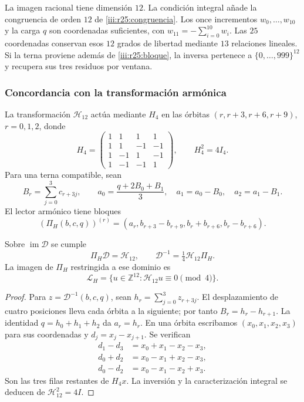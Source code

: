 La imagen racional tiene dimensión $12$. La condición integral añade
la congruencia de orden $12$ de \eqref{iii:r25:congruencia}.
Los once incrementos $w_0,\ldots,w_{10}$ y la carga $q$ son
coordenadas suficientes, con $w_{11}=-\sum_{i=0}^{10}w_i$.
Las $25$ coordenadas conservan esos $12$ grados de libertad
mediante $13$ relaciones lineales. Si la terna proviene además de
\eqref{iii:r25:bloque}, la inversa pertenece a
$\{0,\ldots,999\}^{12}$ y recupera sus tres residuos por ventana.

\subsubsection{Concordancia con la transformación armónica}

La transformación $\mathcal H_{12}$ actúa mediante $H_4$ en las
órbitas $(r,r+3,r+6,r+9)$, $r=0,1,2$, donde
\[
 H_4=\begin{pmatrix}
 1&1&1&1\\1&1&-1&-1\\1&-1&1&-1\\1&-1&-1&1
 \end{pmatrix},\qquad H_4^2=4I_4.
\]
Para una terna compatible, sean
\[
 B_r=\sum_{j=0}^3c_{r+3j},\qquad
 a_0=\frac{q+2B_0+B_1}{3},\quad
 a_1=a_0-B_0,\quad a_2=a_1-B_1.
\]
El lector armónico tiene bloques
\[
 (\Pi_H(b,c,q))^{(r)}
 =(a_r,b_{r+3}-b_{r+9},b_r+b_{r+6},b_r-b_{r+6}).
\]

\begin{proposition}
\label{iii:r25:hadamard}
Sobre $\operatorname{im}\mathcal D$ se cumple
\[
 \Pi_H\mathcal D=\mathcal H_{12},\qquad
 \mathcal D^{-1}=\tfrac14\mathcal H_{12}\Pi_H.
\]
La imagen de $\Pi_H$ restringida a ese dominio es
\[
 \mathcal L_H=
 \{u\in\mathbb Z^{12}:\mathcal H_{12}u\equiv0\pmod4\}.
\]
\end{proposition}
\begin{proof}
Para $z=\mathcal D^{-1}(b,c,q)$, sean
$h_r=\sum_{j=0}^3z_{r+3j}$. El desplazamiento de cuatro posiciones
lleva cada órbita a la siguiente; por tanto $B_r=h_r-h_{r+1}$.
La identidad $q=h_0+h_1+h_2$ da $a_r=h_r$.
En una órbita escribamos $(x_0,x_1,x_2,x_3)$ para sus coordenadas
y $d_j=x_j-x_{j+1}$. Se verifican
\[
 \begin{aligned}
 d_1-d_3&=x_0+x_1-x_2-x_3,\\
 d_0+d_2&=x_0-x_1+x_2-x_3,\\
 d_0-d_2&=x_0-x_1-x_2+x_3.
 \end{aligned}
\]
Son las tres filas restantes de $H_4x$. La inversión y la
caracterización integral se deducen de $\mathcal H_{12}^2=4I$.
\end{proof}

